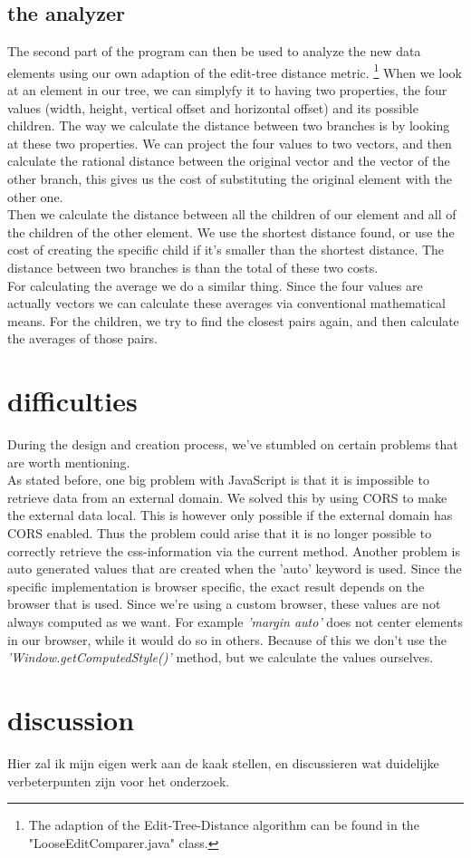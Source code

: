 \subsection{the analyzer}
The second part of the program can then be used to analyze the new data elements using our own adaption of the edit-tree distance metric.
\footnote{The adaption of the Edit-Tree-Distance algorithm can be found in the "LooseEditComparer.java" class.}
When we look at an element in our tree, we can simplyfy it to having two properties, the four values (width, height, vertical offset and horizontal offset) and its possible children. The way we calculate the distance between two branches is by looking at these two properties. We can project the four values to two vectors, and then calculate the rational distance between the original vector and the vector of the other branch, this gives us the cost of substituting the original element with the other one.\\
Then we calculate the distance between all the children of our element and all of the children of the other element. We use the shortest distance found, or use the cost of creating the specific child if it's smaller than the shortest distance. The distance between two branches is than the total of these two costs.\\
For calculating the average we do a similar thing. Since the four values are actually vectors we can calculate these averages via conventional mathematical means. For the children, we try to find the closest pairs again, and then calculate the averages of those pairs.

\section{difficulties}
During the design and creation process, we've stumbled on certain problems that are worth mentioning.\\
As stated before, one big problem with JavaScript is that it is impossible to retrieve data from an external domain. We solved this by using CORS to make the external data local. This is however only possible if the external domain has CORS enabled. Thus the problem could arise that it is no longer possible to correctly retrieve the css-information via the current method.
Another problem is auto generated values that are created when the 'auto' keyword is used. Since the specific implementation is browser specific, the exact result depends on the browser that is used. Since we're using a custom browser, these values are not always computed as we want. For example \textit{'margin auto'} does not center elements in our browser, while it would do so in others. Because of this we don't use the \textit{'Window.getComputedStyle()'} method, but we calculate the values ourselves. 

\section{discussion}
Hier zal ik mijn eigen werk aan de kaak stellen, en discussieren wat duidelijke verbeterpunten zijn voor het onderzoek.